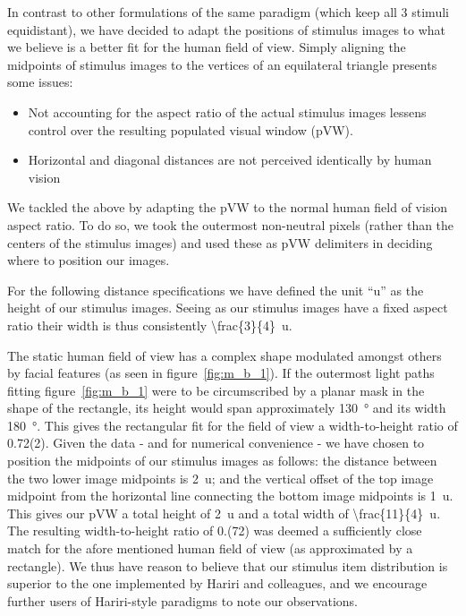 	In contrast to other formulations\cite{Hariri2000,Hariri2003} of the same paradigm (which keep all 3 stimuli equidistant),
	we have decided to adapt the positions of stimulus images to what we believe is a better fit for the human field of view.
	Simply aligning the midpoints of stimulus images to the vertices of an equilateral triangle presents some issues:
	\begin{itemize}
	    \item Not accounting for the aspect ratio of the actual stimulus images lessens control over the resulting populated visual window (pVW).
	    \item Horizontal and diagonal distances are not perceived identically by human vision 
	\end{itemize}
	
	We tackled the above by adapting the pVW to the normal human field of vision aspect ratio.
	To do so, we took the outermost non-neutral pixels (rather than the centers of the stimulus images) and used these as pVW delimiters in deciding where to position our images.
	
	For the following distance specifications we have defined the unit “u” as the height of our stimulus images.
	Seeing as our stimulus images have a fixed aspect ratio their width is thus consistently \SI[parse-numbers = false]{\frac{3}{4}}{u}.
	
	The static human field of view has a complex shape modulated amongst others by facial features (as seen in figure~\ref{fig:m_b_1}).
	If the outermost light paths fitting figure~\ref{fig:m_b_1} were to be circumscribed by a planar mask in the shape of the rectangle, its height would span approximately \SI{130}{\degree} and its width \SI{180}{\degree}.
	This gives the rectangular fit for the field of view a width-to-height ratio of 0.72(2).
	Given the data - and for numerical convenience - we have chosen to position the midpoints of our stimulus images as follows: 
	the distance between the two lower image midpoints is \SI{2}{u}; and the vertical offset of the top image midpoint from the horizontal line connecting the bottom image midpoints is \SI{1}{u}.
	This gives our pVW a total height of \SI{2}{u} and a total width of \SI[parse-numbers = false]{\frac{11}{4}}{u}.
	The resulting width-to-height ratio of 0.(72) was deemed a sufficiently close match for the afore mentioned human field of view (as approximated by a rectangle).
	We thus have reason to believe that our stimulus item distribution is superior to the one implemented by Hariri and colleagues, and we encourage further users of Hariri-style paradigms to note our observations.  
	
